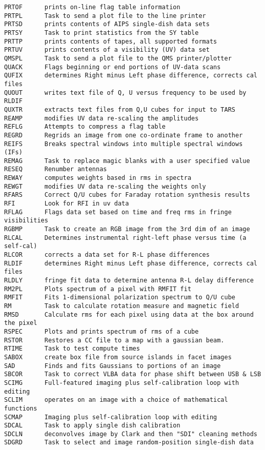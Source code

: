 \begin{verbatim}
PRTOF      prints on-line flag table information
PRTPL      Task to send a plot file to the line printer
PRTSD      prints contents of AIPS single-dish data sets
PRTSY      Task to print statistics from the SY table
PRTTP      prints contents of tapes, all supported formats
PRTUV      prints contents of a visibility (UV) data set
QMSPL      Task to send a plot file to the QMS printer/plotter
QUACK      Flags beginning or end portions of UV-data scans
QUFIX      determines Right minus Left phase difference, corrects cal files
QUOUT      writes text file of Q, U versus frequency to be used by RLDIF
QUXTR      extracts text files from Q,U cubes for input to TARS
REAMP      modifies UV data re-scaling the amplitudes
REFLG      Attempts to compress a flag table
REGRD      Regrids an image from one co-ordinate frame to another
REIFS      Breaks spectral windows into multiple spectral windows (IFs)
REMAG      Task to replace magic blanks with a user specified value
RESEQ      Renumber antennas
REWAY      computes weights based in rms in spectra
REWGT      modifies UV data re-scaling the weights only
RFARS      Correct Q/U cubes for Faraday rotation synthesis results
RFI        Look for RFI in uv data
RFLAG      Flags data set based on time and freq rms in fringe visibilities
RGBMP      Task to create an RGB image from the 3rd dim of an image
RLCAL      Determines instrumental right-left phase versus time (a self-cal)
RLCOR      corrects a data set for R-L phase differences
RLDIF      determines Right minus Left phase difference, corrects cal files
RLDLY      fringe fit data to determine antenna R-L delay difference
RM2PL      Plots spectrum of a pixel with RMFIT fit
RMFIT      Fits 1-dimensional polarization spectrum to Q/U cube
RM         Task to calculate rotation measure and magnetic field
RMSD       Calculate rms for each pixel using data at the box around the pixel
RSPEC      Plots and prints spectrum of rms of a cube
RSTOR      Restores a CC file to a map with a gaussian beam.
RTIME      Task to test compute times
SABOX      create box file from source islands in facet images
SAD        Finds and fits Gaussians to portions of an image
SBCOR      Task to correct VLBA data for phase shift between USB & LSB
SCIMG      Full-featured imaging plus self-calibration loop with editing
SCLIM      operates on an image with a choice of mathematical functions
SCMAP      Imaging plus self-calibration loop with editing
SDCAL      Task to apply single dish calibration
SDCLN      deconvolves image by Clark and then "SDI" cleaning methods
SDGRD      Task to select and image random-position single-dish data

\end{verbatim}
